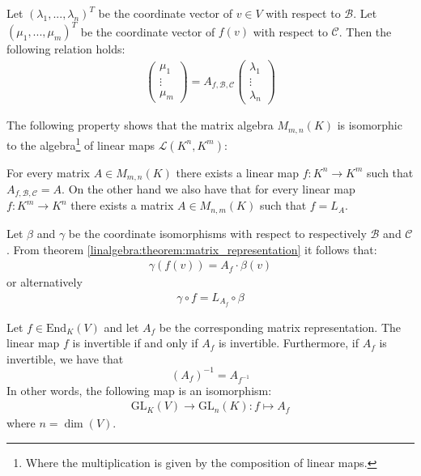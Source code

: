         \begin{property}\label{linalgebra:theorem:matrix_representation}
		Let $(\lambda_1, ..., \lambda_n)^T$ be the coordinate vector of $v\in V$ with respect to $\mathcal{B}$. Let $(\mu_1, ..., \mu_m)^T$ be the coordinate vector of $f(v)$ with respect to $\mathcal{C}$. Then the following relation holds:
            	\begin{gather}
			\left(
			\begin{array}{c}
				\mu_1\\
				\vdots\\
				\mu_m
			\end{array}\right)
	                = A_{f, \mathcal{B}, \mathcal{C}}
        	        \left(\begin{array}{c}
				\lambda_1\\
				\vdots\\
				\lambda_n
			\end{array}\right)
		\end{gather}
	\end{property}
        
        The following property shows that the matrix algebra $M_{m, n}(K)$ is isomorphic to the algebra\footnote{Where the multiplication is given by the composition of linear maps.} of linear maps $\mathcal{L}(K^n, K^m)$:
        \begin{property}\label{linalgebra:theorem:map_matrix_link}
		For every matrix $A\in M_{m,n}(K)$ there exists a linear map $f:K^n\rightarrow K^m$ such that $A_{f, \mathcal{B}, \mathcal{C}} = A$. On the other hand we also have that for every linear map $f:K^m\rightarrow K^n$ there exists a matrix $A\in M_{n,m}(K)$ such that $f=L_A$.
	\end{property}
        \begin{property}
		Let $\beta$ and $\gamma$ be the coordinate isomorphisms with respect to respectively $\mathcal{B}$ and $\mathcal{C}$. From theorem \ref{linalgebra:theorem:matrix_representation} it follows that:
        	\begin{gather}
			\gamma(f(v)) = A_f\cdot\beta(v)
		\end{gather}
        	or alternatively
        	\begin{gather}
			\gamma\circ f = L_{A_f}\circ\beta
		\end{gather}
	\end{property}

        \begin{result}\label{linalgebra:matrix_invertible_map}
	        Let $f\in\text{End}_K(V)$ and let $A_f$ be the corresponding matrix representation. The linear map $f$ is invertible if and only if $A_f$ is invertible. Furthermore, if $A_f$ is invertible, we have that \[\left(A_f\right)^{-1} = A_{f^{-1}}\] In other words, the following map is an isomorphism:
	        \begin{gather}
	        	\text{GL}_K(V)\rightarrow\text{GL}_n(K):f\mapsto A_f
	        \end{gather}
	        where $n=\dim(V)$.
	\end{result}

